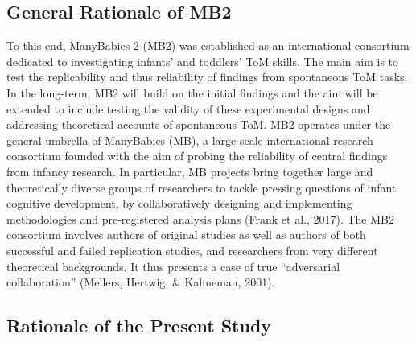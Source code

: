 \documentclass[
  english,
  man,floatsintext]{apa6}
\begin{document}
\hypertarget{general-rationale-of-mb2}{%
\subsection{General Rationale of MB2}\label{general-rationale-of-mb2}}

To this end, ManyBabies 2 (MB2) was established as an international consortium dedicated to investigating infants' and toddlers' ToM skills. The main aim is to test the replicability and thus reliability of findings from spontaneous ToM tasks. In the long-term, MB2 will build on the initial findings and the aim will be extended to include testing the validity of these experimental designs and addressing theoretical accounts of spontaneous ToM. MB2 operates under the general umbrella of ManyBabies (MB), a large-scale international research consortium founded with the aim of probing the reliability of central findings from infancy research. In particular, MB projects bring together large and theoretically diverse groups of researchers to tackle pressing questions of infant cognitive development, by collaboratively designing and implementing methodologies and pre-registered analysis plans (Frank et al., 2017). The MB2 consortium involves authors of original studies as well as authors of both successful and failed replication studies, and researchers from very different theoretical backgrounds. It thus presents a case of true ``adversarial collaboration'' (Mellers, Hertwig, \& Kahneman, 2001).

\hypertarget{rationale-of-the-present-study}{%
\subsection{Rationale of the Present Study}\label{rationale-of-the-present-study}}
\end{document}

